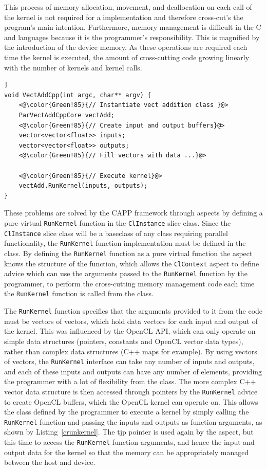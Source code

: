 \documentclass{sig-alternate-05-2015}
\begin{document}
This process of memory allocation, movement, and
deallocation on each call of the kernel is not required for a \CPP implementation
and therefore cross-cut's the program's main intention. Furthermore, memory management 
is difficult in the C and \CPP languages because it is the programmer's
responsibility. This is magnified by the introduction of the device memory. 
As these operations are required each 
time the kernel is executed, the amount of cross-cutting code growing linearly 
with the number of kernels and kernel calls. 

\begin{lstlisting}[caption=Execution of a parallel kernel from a \CPP class.,label=crunkernel,float=[!t]]
void VectAddCpp(int argc, char** argv) {
	<@\color{Green!85}{// Instantiate vect addition class }@>
	ParVectAddCppCore vectAdd;
	<@\color{Green!85}{// Create input and output buffers}@>
	vector<vector<float>> inputs;
	vector<vector<float>> outputs;
	<@\color{Green!85}{// Fill vectors with data ...}@>
  
	<@\color{Green!85}{// Execute kernel}@>
	vectAdd.RunKernel(inputs, outputs);
}
\end{lstlisting}

These problems are solved by the CAPP framework through aspects by defining
a pure virtual \lstinline$RunKernel$ function in the \lstinline$ClInstance$ slice class. 
Since the \lstinline$ClInstance$ slice class will be a baseclass of any \CPP class requiring parallel 
functionality, the \lstinline$RunKernel$ function implementation must be defined in the 
\CPP class. By defining the \lstinline$RunKernel$ function as a pure virtual
function the aspect knows the structure of the function, which allows the 
\lstinline$ClContext$ aspect to define advice which can use the arguments passed to
the \lstinline$RunKernel$ function by the programmer, to perform the cross-cutting 
memory management code each time the \lstinline$RunKernel$ function is called from
the \CPP class.

The \lstinline$RunKernel$ function specifies that the arguments provided to it from the
\CPP code must be vectors of vectors, which hold data vectors for each input and
output of the kernel. This was influenced by the OpenCL API, which can only
operate on simple data structures (pointers, constants and OpenCL vector data
types), rather than complex data structures (C++ maps for example). 
By using vectors of vectors, the \lstinline$RunKernel$ interface can take any 
number of inputs and outputs, and each of these inputs and outputs can have any
number of elements, providing the programmer with a lot of flexibility from the
\CPP class. The more complex C++ vector data structure is then accessed through
pointers by the \lstinline$RunKernel$ advice to create OpenCL buffers, which the OpenCL kernel 
can operate on. This allows the \CPP class defined 
by the programmer to execute a kernel by simply calling the \lstinline$RunKernel$ function and 
passing the inputs and outputs as function arguments, as shown by Listing~\ref{crunkernel}. 
The tjp pointer is  used again by the aspect, but this time to access the \lstinline$RunKernel$ 
function arguments, and hence the input and output data for the kernel so that the memory can be
appropriately managed between the host and device.
\end{document}
